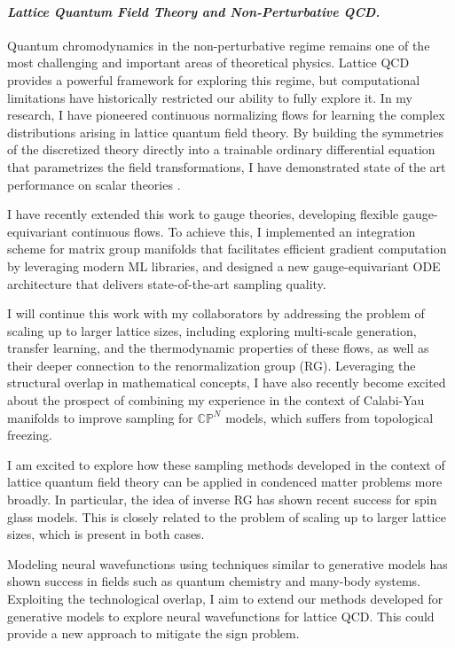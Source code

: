 \documentclass[11pt]{article}
\begin{document}
{\color{royalblue}{Relevant members of RPC: Prof Andre Lukas, Joseph Conlon.}}

\paragraph{\textit{{Lattice Quantum Field Theory and Non-Perturbative QCD.}}}
Quantum chromodynamics in the non-perturbative regime remains one of the most challenging and important areas of theoretical physics.
Lattice QCD provides a powerful framework for exploring this regime, but computational limitations have historically restricted our ability to fully explore it.
In my research, I have pioneered continuous normalizing flows for learning the complex distributions arising in lattice quantum field theory. By building the symmetries of the discretized theory directly into a trainable ordinary differential equation that parametrizes the field transformations, I have demonstrated state of the art performance on scalar theories \cite{gerdes2023LearningLattice}.


I have recently extended this work to gauge theories, developing flexible gauge-equivariant continuous flows.
To achieve this, I implemented an integration scheme for matrix group manifolds that facilitates efficient gradient computation by leveraging modern ML libraries, and designed a new gauge-equivariant ODE architecture that delivers state-of-the-art sampling quality.

\textbf{\color{royalblue}{Future Directions.}}
I will continue this work with my collaborators by addressing the problem of scaling up to larger lattice sizes, including exploring multi-scale generation, transfer learning, and the thermodynamic properties of these flows, as well as their deeper connection to the renormalization group (RG). Leveraging the structural overlap in mathematical concepts, I have also recently become excited about the prospect of combining my experience in the context of Calabi-Yau manifolds to improve sampling for $\mathbb{CP}^N$ models, which suffers from topological freezing.

I am excited to explore how these sampling methods developed in the context of lattice quantum field theory can be applied in condenced matter problems more broadly.
In particular, the idea of inverse RG has shown recent success for spin glass models.
This is closely related to the problem of scaling up to larger lattice sizes, which is present in both cases.

Modeling neural wavefunctions using techniques similar to generative models has shown success in fields such as quantum chemistry and many-body systems. Exploiting the technological overlap, I aim to extend our methods developed for generative models to explore neural wavefunctions for lattice QCD. This could provide a new approach to mitigate the sign problem.
\end{document}
